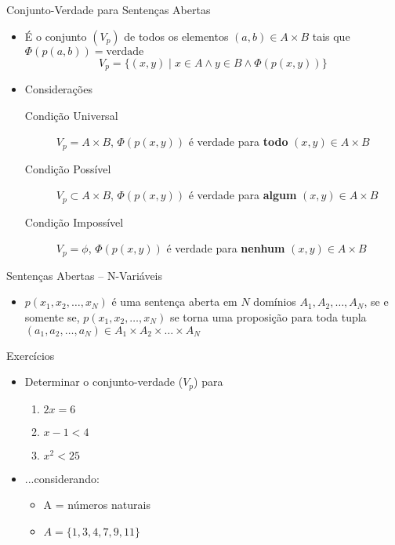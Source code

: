 \begin{frame}[t]{Conjunto-Verdade para Sentenças Abertas}
	\begin{itemize} \itemsep 0.7cm
	\item É o conjunto $(V_p)$ de todos os elementos $(a, b) \in A \times B$ tais que $\Phi(p(a,b)) = \mbox{verdade}$ $$V_p = \{(x,y) \mid x \in A \wedge y \in B \wedge \Phi(p(x,y)) \}$$

	\item Considerações
	\begin{description}
	\item [Condição Universal] $V_p = A \times B$, $\Phi(p(x,y))$ é verdade para {\bf todo} $(x,y) \in A \times B$
	\item [Condição Possível]  $V_p \subset A \times B$, $\Phi(p(x,y))$ é verdade para {\bf algum} $(x,y) \in A \times B$
	\item [Condição Impossível] $V_p = \phi$, $\Phi(p(x,y))$ é verdade para {\bf nenhum} $(x,y) \in A \times B$
	\end{description}
	\end{itemize}
\end{frame}

\begin{frame}[t]{Sentenças Abertas -- N-Variáveis}
	\begin{itemize} \itemsep 0.4cm
	\item $p(x_1, x_2, \ldots, x_N)$ é uma sentença aberta em $N$ domínios $A_1, A_2, \ldots, A_N$, se e somente se, $p(x_1, x_2, \ldots, x_N)$ se torna uma proposição para toda tupla $(a_1, a_2, \ldots, a_N) \in A_1 \times A_2 \times \ldots \times A_N$
	\end{itemize}
\end{frame}

\begin{frame}[t]{Exercícios}
	\begin{itemize}
	\item Determinar o conjunto-verdade ($V_p$) para
	\begin{enumerate}
	\item $2x = 6$
	\item $x - 1 < 4$
	\item $x^2 < 25$
	\end{enumerate}

	\item ...considerando:
	\begin{itemize}
	\item A = números naturais
	\item $A = \{ 1, 3, 4, 7, 9, 11 \}$
	\end{itemize}
	\end{itemize}
\end{frame}

